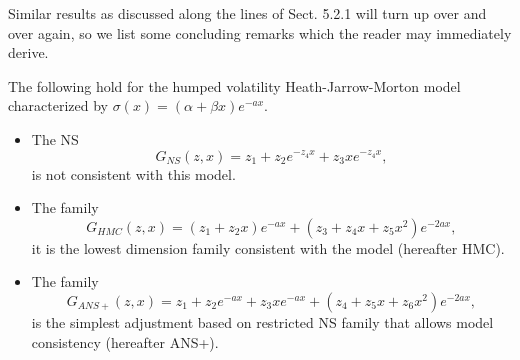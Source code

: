 Similar results as discussed along the lines of Sect. 5.2.1 will turn
up over and over again, so we list some concluding remarks which the
reader may immediately derive.
\begin{lema} The following hold for the humped volatility
  Heath-Jarrow-Morton model characterized by $\sigma(x)=(\alpha +
  \beta x) e^{-a x}$. 
\begin{itemize}
\item The NS 
$$
G_{NS}(z,x)=z_1+z_2e^{-z_4 x}+z_3 x e^{-z_4 x},
$$
is not consistent with this model.
\item The family 
$$
G_{HMC}(z,x)=(z_1+z_2 x)e^{-a x}+(z_3+z_4 x+z_5 x^2)e^{-2 a x},
$$
it is the lowest dimension family consistent with the model (hereafter HMC).
\item The family
$$
G_{ANS+}(z,x)=z_1+z_2e^{-a x}+z_3 xe^{-a x}+(z_4+z_5 x+z_6 x^2)e^{-2 a x},
$$
is the simplest adjustment based on restricted NS family that allows model
consistency (hereafter ANS+).
\end{itemize}
\end{lema}



